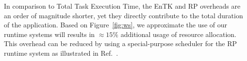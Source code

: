 In comparison to Total Task Execution Time, the EnTK and RP overheads are an
order of magnitude shorter, yet they directly contribute to the total
duration of the application. Based on Figure~\ref{fig:ws}, we approximate the
use of our runtime systems will results in $\approx15\%$ additional usage of
resource allocation. This overhead can be reduced by using a special-purpose
scheduler for the RP runtime system as illustrated in Ref.~\cite{merzky2018}.









